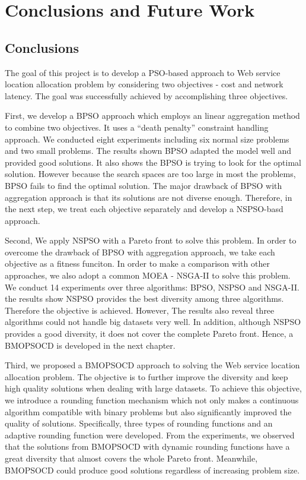 \chapter{Conclusions and Future Work}\label{C:clu}
\section{Conclusions}
The goal of this project is to develop a PSO-based approach to Web service location allocation problem by considering two 
objectives - cost and network latency. The goal was successfully achieved by accomplishing three objectives.


First, we develop a BPSO approach which employs an linear aggregation method to combine two objectives. 
It uses a ``death penalty'' constraint handling approach. We conducted eight experiments including six normal size problems and two small problems.  The results shown BPSO adapted the model well and provided good solutions. It also shows the BPSO is trying to look for the optimal solution. However because the search spaces are too large in most the problems, BPSO fails
to find the optimal solution. The major drawback of BPSO with aggregation approach is that its solutions are not diverse enough. Therefore, in the next step, we treat each objective separately and develop a NSPSO-basd approach.

Second, We apply NSPSO with a Pareto front to solve this problem. In order to overcome the drawback of BPSO with aggregation approach, we take each objective as a fitness funciton.  In order to make a comparison with other approaches, we also adopt
a common MOEA - NSGA-II to solve this problem. We conduct 14 experiments over three algorithms: BPSO, NSPSO and NSGA-II.
the results show NSPSO provides the best diversity among three algorithms. Therefore the objective is achieved. However,
The results also reveal three algorithms could not handle big datasets very well. In addition, although NSPSO provides a good diversity, it does not cover the complete Pareto front. Hence, a BMOPSOCD is developed 
in the next chapter.

Third, we proposed a BMOPSOCD approach to solving the Web service location allocation problem. The objective is to further improve the diversity and keep high quality solutions when dealing with large datasets. To achieve this objective, we introduce a rounding function mechanism which
not only makes a continuous algorithm compatible with binary problems but also significantly improved the quality of solutions.
Specifically, three types of rounding functions and an adaptive rounding function were developed.
From the experiments, we observed that the solutions from BMOPSOCD with dynamic rounding functions have a great diversity that almost covers the whole Pareto front. 
Meanwhile, BMOPSOCD could produce good solutions regardless of increasing problem size.

